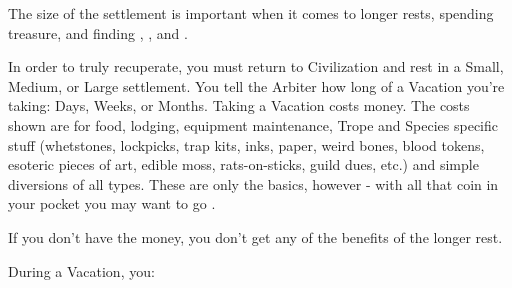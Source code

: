 {  The size of the settlement is important when it comes to longer rests, spending treasure, and finding , , and .

  \cbreak

  
  In order to truly recuperate, you must return to Civilization and rest in a Small, Medium, or Large settlement. You tell the Arbiter how long of a Vacation you're taking: Days, Weeks, or Months. Taking a Vacation costs money.  The costs shown are for food, lodging, equipment maintenance, Trope and Species specific stuff (whetstones, lockpicks, trap kits, inks, paper, weird bones, blood tokens, esoteric pieces of art, edible moss, rats-on-sticks, guild dues, etc.) and simple diversions of all types.  These are only the basics, however - with all that coin in your pocket you may want to go . 

  If you don't have the money, you don't get any of the benefits of the longer rest.


  During a Vacation, you:


  \cbreak

}
